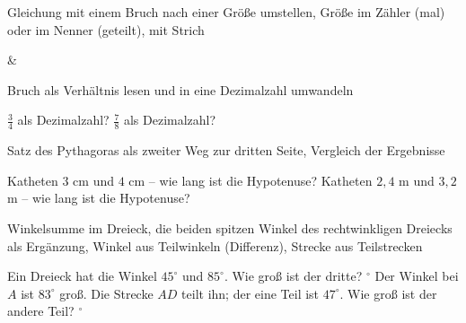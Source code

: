 \begin{aufgabe}{Gleichung mit einem Bruch nach einer Größe umstellen, Größe im Zähler (mal) oder im Nenner (geteilt), mit Strich}
\begin{gleichungsraster}[2]
 &
 \\
\end{gleichungsraster}
\end{aufgabe}

\begin{aufgabe}{Bruch als Verhältnis lesen und in eine Dezimalzahl umwandeln}
\begin{teile}
\teil $\frac{3}{4}$ als Dezimalzahl? \leerfeld
\teil $\frac{7}{8}$ als Dezimalzahl? \leerfeld
\end{teile}
\end{aufgabe}

\begin{aufgabe}{Satz des Pythagoras als zweiter Weg zur dritten Seite, Vergleich der Ergebnisse}
\begin{teile}
\teil Katheten $3$ cm und $4$ cm – wie lang ist die Hypotenuse? \leerfeld[cm]
\teil Katheten $2{,}4$ m und $3{,}2$ m – wie lang ist die Hypotenuse? \leerfeld[m]
\end{teile}
\end{aufgabe}

\begin{aufgabe}{Winkelsumme im Dreieck, die beiden spitzen Winkel des rechtwinkligen Dreiecks als Ergänzung, Winkel aus Teilwinkeln (Differenz), Strecke aus Teilstrecken}
\begin{teile}
\teil Ein Dreieck hat die Winkel $45^\circ$ und $85^\circ$. Wie groß ist der dritte? \leerfeld $^\circ$
\teil Der Winkel bei $A$ ist $83^\circ$ groß. Die Strecke $AD$ teilt ihn; der eine Teil ist $47^\circ$. Wie groß ist der andere Teil? \leerfeld $^\circ$
\end{teile}
\end{aufgabe}

